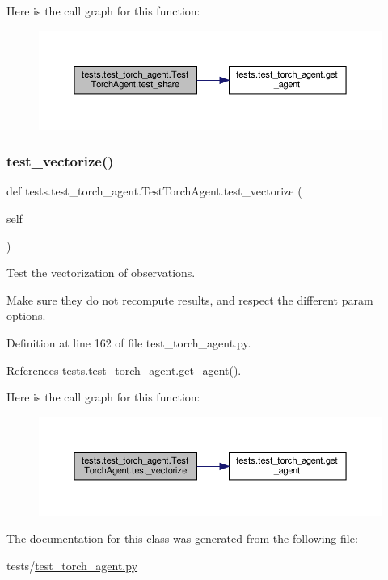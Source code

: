 Here is the call graph for this function\+:
\nopagebreak
\begin{figure}[H]
\begin{center}
\leavevmode
\includegraphics[width=350pt]{classtests_1_1test__torch__agent_1_1TestTorchAgent_af3d1c7681a30a06684117464ccefb15d_cgraph}
\end{center}
\end{figure}
\mbox{\label{classtests_1_1test__torch__agent_1_1TestTorchAgent_a551847086a9d8bf6bc04ea1efeacf608}} 
\subsubsection{\texorpdfstring{test\+\_\+vectorize()}{test\_vectorize()}}
{\footnotesize\ttfamily def tests.\+test\+\_\+torch\+\_\+agent.\+Test\+Torch\+Agent.\+test\+\_\+vectorize (\begin{DoxyParamCaption}\item[{}]{self }\end{DoxyParamCaption})}

\begin{DoxyVerb}Test the vectorization of observations.

Make sure they do not recompute results, and respect the different
param options.
\end{DoxyVerb}
 

Definition at line 162 of file test\+\_\+torch\+\_\+agent.\+py.



References tests.\+test\+\_\+torch\+\_\+agent.\+get\+\_\+agent().

Here is the call graph for this function\+:
\nopagebreak
\begin{figure}[H]
\begin{center}
\leavevmode
\includegraphics[width=350pt]{classtests_1_1test__torch__agent_1_1TestTorchAgent_a551847086a9d8bf6bc04ea1efeacf608_cgraph}
\end{center}
\end{figure}


The documentation for this class was generated from the following file\+:\begin{DoxyCompactItemize}
\item 
tests/\hyperlink{test__torch__agent_8py}{test\+\_\+torch\+\_\+agent.\+py}\end{DoxyCompactItemize}
